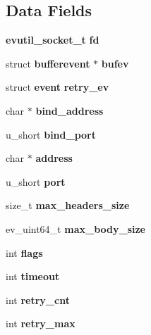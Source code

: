 \subsection*{\-Data \-Fields}
\begin{DoxyCompactItemize}
\item 
{\bf evutil\-\_\-socket\-\_\-t} {\bfseries fd}\label{structevhttp__connection_adf76ebacdedde5572e9ba938beab2afe}

\item 
struct {\bf bufferevent} $\ast$ {\bfseries bufev}\label{structevhttp__connection_a767573fa073cd8fc1496a62d8f04e1a2}

\item 
struct {\bf event} {\bfseries retry\-\_\-ev}\label{structevhttp__connection_a2ce90a2aaa826e058b0c88f09ebba04c}

\item 
char $\ast$ {\bfseries bind\-\_\-address}\label{structevhttp__connection_ae15b37b2cdfd51bbb2719e4eb3ffb917}

\item 
u\-\_\-short {\bfseries bind\-\_\-port}\label{structevhttp__connection_af7bc7b02b844328a348cc7f44ec3c84e}

\item 
char $\ast$ {\bfseries address}\label{structevhttp__connection_a879a8cdf605d02f8af8b2e216b8764f2}

\item 
u\-\_\-short {\bfseries port}\label{structevhttp__connection_ace814d889911ace80bb2ca8d0a0a9df2}

\item 
size\-\_\-t {\bfseries max\-\_\-headers\-\_\-size}\label{structevhttp__connection_a5e13483dd759d74b020d514f39ee9211}

\item 
ev\-\_\-uint64\-\_\-t {\bfseries max\-\_\-body\-\_\-size}\label{structevhttp__connection_aadf8c915c4b0e5ca573b147d360b4079}

\item 
int {\bfseries flags}\label{structevhttp__connection_ac8bf36fe0577cba66bccda3a6f7e80a4}

\item 
int {\bfseries timeout}\label{structevhttp__connection_a493b57f443cc38b3d3df9c1e584d9d82}

\item 
int {\bfseries retry\-\_\-cnt}\label{structevhttp__connection_abdbbededb294958e8394aa631ef5ea0d}

\item 
int {\bfseries retry\-\_\-max}\label{structevhttp__connection_aeba4c70f5ccbdf7b25c20020261f7d09}


\end{DoxyCompactItemize}
